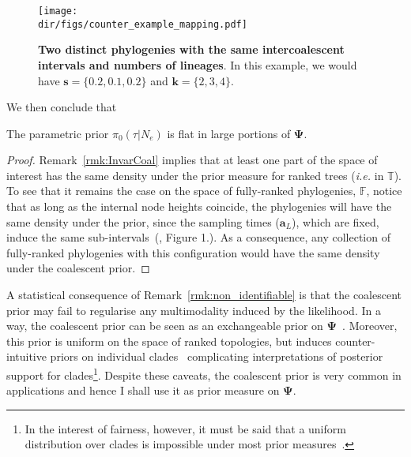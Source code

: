 \begin{figure}[!ht]
  \centering
  \texttt{[image: \\dir/figs/counter\_example\_mapping.pdf]}
\caption[Two distinct phylogenies with the same intercoalescent intervals and numbers of lineages.]{\textbf{Two distinct phylogenies with the same intercoalescent intervals and numbers of lineages}.
In this example, we would have $\boldsymbol s = \{0.2, 0.1, 0.2\}$ and $\boldsymbol k = \{2, 3, 4\}$.
}
\label{fig:cexample}
\end{figure}

We then conclude that
\begin{remark}
\label{rmk:non_identifiable}
  The parametric prior $\pi_0(\tau| N_e)$ is flat in large portions of $\boldsymbol\Psi$.
\end{remark}
\begin{proof}
Remark~\ref{rmk:InvarCoal} implies that at least one part of the space of interest has the same density under the prior measure for ranked trees (\textit{i.e.} in $\mathbb{T}$).
To see that it remains the case on the space of fully-ranked phylogenies, $\mathbb{F}$, notice that as long as the internal node heights coincide, the phylogenies will have the same density under the prior, since the sampling times ($\boldsymbol a_L$), which are fixed, induce the same sub-intervals~(\cite{Minin2008}, Figure 1.).
As a consequence, any collection of fully-ranked phylogenies with this configuration would have the same density under the coalescent prior. 
\end{proof}

A statistical consequence of Remark~\ref{rmk:non_identifiable} is that the coalescent prior may fail to regularise any multimodality induced by the likelihood.
In a way, the coalescent prior can be seen as an exchangeable prior on $\boldsymbol \Psi$~\citep{Aldous1996}.
Moreover, this prior is uniform on the space of ranked topologies, but induces counter-intuitive priors on individual clades~\citep{Pickett2005} complicating interpretations of posterior support for clades\footnote{In the interest of fairness, however, it must be said that a uniform distribution over clades is impossible under most prior measures~\citep{Steel2006}.}.
Despite these caveats, the coalescent prior is very common in applications and hence I shall use it as prior measure on $\boldsymbol \Psi$.

